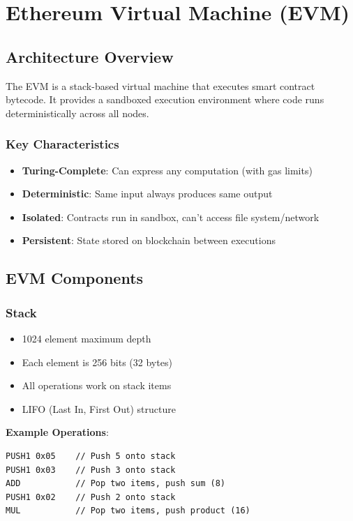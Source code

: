 \documentclass[11pt,a4paper]{article}
\begin{document}
\section{Ethereum Virtual Machine (EVM)}

\subsection{Architecture Overview}

The EVM is a stack-based virtual machine that executes smart contract bytecode. It provides a sandboxed execution environment where code runs deterministically across all nodes.

\subsubsection{Key Characteristics}

\begin{itemize}
  \item \textbf{Turing-Complete}: Can express any computation (with gas limits)
  \item \textbf{Deterministic}: Same input always produces same output
  \item \textbf{Isolated}: Contracts run in sandbox, can't access file system/network
  \item \textbf{Persistent}: State stored on blockchain between executions
\end{itemize}

\subsection{EVM Components}

\subsubsection{Stack}

\begin{itemize}
  \item 1024 element maximum depth
  \item Each element is 256 bits (32 bytes)
  \item All operations work on stack items
  \item LIFO (Last In, First Out) structure
\end{itemize}

\textbf{Example Operations}:
\begin{verbatim}
PUSH1 0x05    // Push 5 onto stack
PUSH1 0x03    // Push 3 onto stack
ADD           // Pop two items, push sum (8)
PUSH1 0x02    // Push 2 onto stack
MUL           // Pop two items, push product (16)
\end{verbatim}
\end{document}
